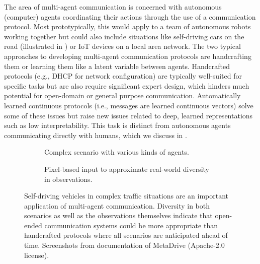 The area of multi-agent communication is concerned with autonomous (computer) agents coordinating their actions through the use of a communication protocol.
Most prototypically, this would apply to a team of autonomous robots working together but could also include situations like self-driving cars on the road (illustrated in ) or IoT devices on a local area network.
The two typical approaches to developing multi-agent communication protocols are handcrafting them or learning them like a latent variable between agents.
Handcrafted protocols (e.g., DHCP for network configuration) are typically well-suited for specific tasks but are also require significant expert design, which hinders much potential for open-domain or general purpose communication.
Automatically learned continuous protocols (i.e., messages are learned continuous vectors) solve some of these issues but raise new issues related to deep, learned representations such as low interpretability.
This task is distinct from autonomous agents communicating directly with humans, which we discuss in .

\begin{figure}
  \centering
  \def\figwidth{0.45\textwidth}
  \begin{subfigure}[t]{\figwidth}
    \centering
    \setlength{\fboxsep}{0pt}
    \caption{Complex scenario with various kinds of agents.}
  \end{subfigure}
  \begin{subfigure}[t]{\figwidth}
    \centering
    \caption{Pixel-based input to approximate real-world diversity in observations.}
  \end{subfigure}
  \caption{%
    Self-driving vehicles in complex traffic situations are an important application of multi-agent communication.
    Diversity in both scenarios as well as the observations themselves indicate that open-ended communication systems could be more appropriate than handcrafted protocols where all scenarios are anticipated ahead of time.
    Screenshots from documentation of MetaDrive \citep{li2023metadrive} (Apache-2.0 license).
  }
  \unskip\label{fig:self-driving}
\end{figure}

